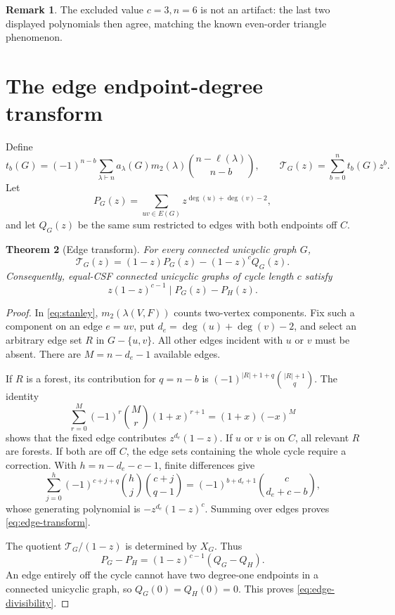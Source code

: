 \documentclass[11pt]{amsart}
\newtheorem{theorem}{Theorem}[section]
\theoremstyle{definition}
\newtheorem{remark}[theorem]{Remark}
\newcommand{\CSF}{X}
\newcommand{\cycle}{C}
\begin{document}
\begin{remark}
The excluded value \(c=3,n=6\) is not an artifact: the last two displayed
polynomials then agree, matching the known even-order triangle phenomenon.
\end{remark}

\section{The edge endpoint-degree transform}

Define
\[
t_b(G)=(-1)^{n-b}\sum_{\lambda\vdash n}a_\lambda(G)
m_2(\lambda)\binom{n-\ell(\lambda)}{n-b},
\qquad \mathcal T_G(z)=\sum_{b=0}^{n}t_b(G)z^b.
\]
Let
\[
P_G(z)=\sum_{uv\in E(G)}z^{\deg(u)+\deg(v)-2},
\]
and let \(Q_G(z)\) be the same sum restricted to edges with both endpoints
off \(\cycle\).

\begin{theorem}[Edge transform]\label{thm:edge-transform}
For every connected unicyclic graph \(G\),
\begin{equation}\label{eq:edge-transform}
\mathcal T_G(z)=(1-z)P_G(z)-(1-z)^{c}Q_G(z).
\end{equation}
Consequently, equal-CSF connected unicyclic graphs of cycle length \(c\)
satisfy
\begin{equation}\label{eq:edge-divisibility}
z(1-z)^{c-1}\mid P_G(z)-P_H(z).
\end{equation}
\end{theorem}

\begin{proof}
In \eqref{eq:stanley}, \(m_2(\lambda(V,F))\) counts two-vertex components.
Fix such a component on an edge \(e=uv\), put
\(d_e=\deg(u)+\deg(v)-2\), and select an arbitrary edge set \(R\) in
\(G-\{u,v\}\).  All other edges incident with \(u\) or \(v\) must be
absent.  There are \(M=n-d_e-1\) available edges.

If \(R\) is a forest, its contribution for \(q=n-b\) is
\((-1)^{|R|+1+q}\binom{|R|+1}{q}\).  The identity
\[
\sum_{r=0}^{M}(-1)^r\binom Mr(1+x)^{r+1}=(1+x)(-x)^M
\]
shows that the fixed edge contributes \(z^{d_e}(1-z)\).
If \(u\) or \(v\) is on \(\cycle\), all relevant \(R\) are forests.  If
both are off \(\cycle\), the edge sets containing the whole cycle require a
correction.  With \(h=n-d_e-c-1\), finite differences give
\[
\sum_{j=0}^{h}(-1)^{c+j+q}\binom hj\binom{c+j}{q-1}
=(-1)^{b+d_e+1}\binom c{d_e+c-b},
\]
whose generating polynomial is \(-z^{d_e}(1-z)^c\).  Summing over edges
proves \eqref{eq:edge-transform}.

The quotient \(\mathcal T_G/(1-z)\) is determined by \(\CSF_G\).  Thus
\[
P_G-P_H=(1-z)^{c-1}(Q_G-Q_H).
\]
An edge entirely off the cycle cannot have two degree-one endpoints in a
connected unicyclic graph, so \(Q_G(0)=Q_H(0)=0\).  This proves
\eqref{eq:edge-divisibility}.
\end{proof}
\end{document}
